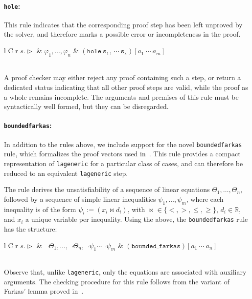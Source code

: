 \paragraph{\texttt{hole}:} This rule indicates that the corresponding proof step has been left unproved by the solver, and therefore marks a possible error or incompleteness in the proof.

\noindent\begin{tabularx}{\linewidth}{ l C r }
	$s.\triangleright$ & 
	$\varphi_1,\dots,\varphi_n$ & 
	${\mathtt{(hole \: s_1,\:\cdots\: s_k)}[a_1 \: \cdots \: a_m]}$
\end{tabularx} \\

A proof checker may either reject any proof containing such a step, or return a dedicated status indicating that all other proof steps are valid, while the proof as a whole remains incomplete.
The arguments and premises of this rule must be syntactically well formed, but they can be disregarded.
 
\paragraph{\texttt{bounded\textunderscore farkas}:}
In addition to the rules above, we include support for the novel
\texttt{bounded\textunderscore farkas} rule, which formalizes the proof vectors
used in~\cite{IsBaZhKa22}. This rule provides a compact representation of
\texttt{la\textunderscore generic} for a particular class of cases, and can
therefore be reduced to an equivalent \texttt{la\textunderscore generic} step.

The rule derives the unsatisfiability of a sequence of linear equations
$\Theta_1,\ldots,\Theta_n$, followed by a sequence of simple linear inequalities
$\psi_1,\ldots,\psi_m$, where each inequality is of the form
$\psi_i := (x_i \bowtie d_i)$, with
$\bowtie \in \{<,>,\leq,\geq\}$, $d_i \in \mathbb{R}$, and $x_i$ a unique variable per inequality.
Using the above, the \texttt{bounded\textunderscore farkas} rule has the structure:

\noindent\begin{tabularx}{\linewidth}{ l C r }
	$s.\triangleright$ & 
	$\lnot\Theta_1,\dots,\lnot\Theta_n,\lnot\psi_1\cdots\lnot\psi_m$ & 
	${\mathtt{(bounded\_farkas)}[a_1 \: \cdots \: a_n]}$
\end{tabularx} \\

Observe that, unlike \texttt{la\textunderscore generic}, only the equations are associated with auxiliary arguments. The checking procedure for this rule follows from the variant of Farkas' lemma proved in~\cite{IsBaZhKa22}.

